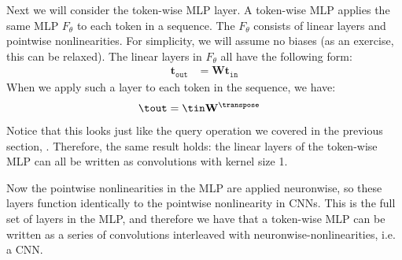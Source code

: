 Next we will consider the token-wise MLP layer. A token-wise MLP applies the same MLP $F_{\theta}$ to each token in a sequence. The $F_{\theta}$ consists of linear layers and pointwise nonlinearities. For simplicity, we will assume no biases (as an exercise, this can be relaxed). The linear layers in $F_{\theta}$ all have the following form:
\begin{align}
    \mathbf{t}_{\texttt{out}} & = \mathbf{W}\mathbf{t}_{\texttt{in}}
\end{align}
When we apply such a layer to each token in the sequence, we have:
\begin{align}
    \tout & = \tin\mathbf{W}^{\transpose}
\end{align}
Notice that this looks just like the query operation we covered in the previous section, \eqn{\ref{eqn:transformers:query_matrix}}. Therefore, the same result holds: the linear layers of the token-wise MLP can all be written as convolutions with kernel size 1.

Now the pointwise nonlinearities in the MLP are applied neuronwise, so these layers function identically to the pointwise nonlinearity in CNNs. This is the full set of layers in the MLP, and therefore we have that a token-wise MLP can be written as a series of convolutions interleaved with neuronwise-nonlinearities, i.e. a CNN.


